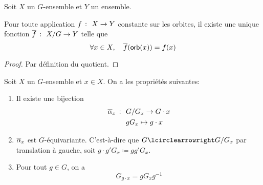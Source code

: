 







\begin{proposition}
    Soit \(X\) un \(G\)-ensemble et \(Y\) un ensemble.

    Pour toute application \(f\ \colon\  X\to Y\) constante sur les orbites, il existe une
    unique fonction \(\overline{f}\ \colon\  X/G \to Y\) telle que
    \begin{equation*}
        \forall x\in X,\quad \overline{f}(\operatorname{\mathsf{orb}} (x)) = f(x)
    \end{equation*}
\end{proposition}

\begin{proof}
    Par définition du quotient.
\end{proof}

\begin{lemma}
    Soit \(X\) un \(G\)-ensemble et \(x\in X\). On a les propriétés suivantes:
    \begin{enumerate}[label=(\roman*)] %
        \item Il existe une bijection
        \begin{equation*}
            \begin{aligned}
                \overline{\alpha}_x\ \colon\  &G/G_x\to G\cdot x\\
                &gG_x\mapsto g\cdot x
            \end{aligned}
        \end{equation*}

        \item \({\overline{\alpha}}_x\) est \(G\)-équivariante. C'est-à-dire que \(G\act G/G_x\)
        par translation à gauche, soit \(g\cdot g' G_x \coloneqq gg' G_x\).

        \item Pour tout \(g\in G\), on a
        \begin{equation*}
            G_{g\cdot x} = gG_x g^{-1}
        \end{equation*}
    \end{enumerate}
\end{lemma}

